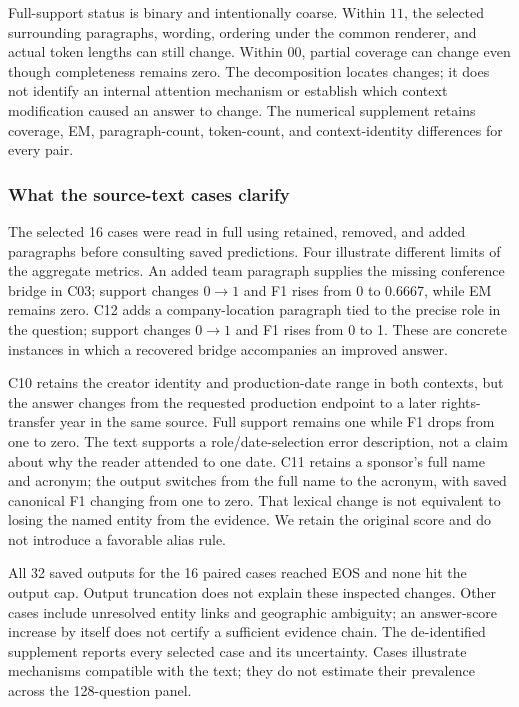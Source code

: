 \documentclass[preprint,12pt]{elsarticle}
\begin{document}
Full-support status is binary and intentionally coarse. Within $11$, the selected surrounding paragraphs, wording, ordering under the common renderer, and actual token lengths can still change. Within $00$, partial coverage can change even though completeness remains zero. The decomposition locates changes; it does not identify an internal attention mechanism or establish which context modification caused an answer to change. The numerical supplement retains coverage, EM, paragraph-count, token-count, and context-identity differences for every pair.

\subsubsection{What the source-text cases clarify}
The selected 16 cases were read in full using retained, removed, and added paragraphs before consulting saved predictions. Four illustrate different limits of the aggregate metrics. An added team paragraph supplies the missing conference bridge in C03; support changes $0\to1$ and F1 rises from 0 to 0.6667, while EM remains zero. C12 adds a company-location paragraph tied to the precise role in the question; support changes $0\to1$ and F1 rises from 0 to 1. These are concrete instances in which a recovered bridge accompanies an improved answer.

C10 retains the creator identity and production-date range in both contexts, but the answer changes from the requested production endpoint to a later rights-transfer year in the same source. Full support remains one while F1 drops from one to zero. The text supports a role/date-selection error description, not a claim about why the reader attended to one date. C11 retains a sponsor's full name and acronym; the output switches from the full name to the acronym, with saved canonical F1 changing from one to zero. That lexical change is not equivalent to losing the named entity from the evidence. We retain the original score and do not introduce a favorable alias rule.

All 32 saved outputs for the 16 paired cases reached EOS and none hit the output cap. Output truncation does not explain these inspected changes. Other cases include unresolved entity links and geographic ambiguity; an answer-score increase by itself does not certify a sufficient evidence chain. The de-identified supplement reports every selected case and its uncertainty. Cases illustrate mechanisms compatible with the text; they do not estimate their prevalence across the 128-question panel.
\end{document}
